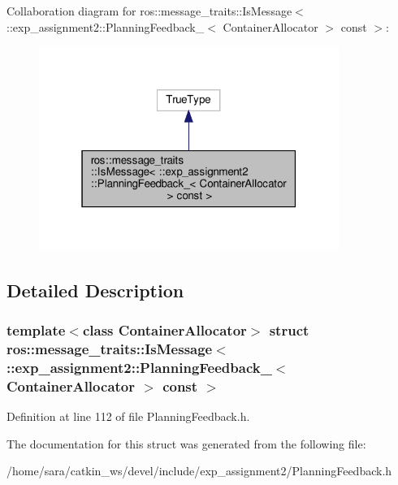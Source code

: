 Collaboration diagram for ros\+:\+:message\+\_\+traits\+:\+:Is\+Message$<$ \+:\+:exp\+\_\+assignment2\+:\+:Planning\+Feedback\+\_\+$<$ Container\+Allocator $>$ const $>$\+:
\nopagebreak
\begin{figure}[H]
\begin{center}
\leavevmode
\includegraphics[width=277pt]{structros_1_1message__traits_1_1IsMessage_3_01_1_1exp__assignment2_1_1PlanningFeedback___3_01Con2dabe4eb250de3f9bec28ef131438574}
\end{center}
\end{figure}


\subsection{Detailed Description}
\subsubsection*{template$<$class Container\+Allocator$>$\newline
struct ros\+::message\+\_\+traits\+::\+Is\+Message$<$ \+::exp\+\_\+assignment2\+::\+Planning\+Feedback\+\_\+$<$ Container\+Allocator $>$ const $>$}



Definition at line 112 of file Planning\+Feedback.\+h.



The documentation for this struct was generated from the following file\+:\begin{DoxyCompactItemize}
\item 
/home/sara/catkin\+\_\+ws/devel/include/exp\+\_\+assignment2/Planning\+Feedback.\+h\end{DoxyCompactItemize}
